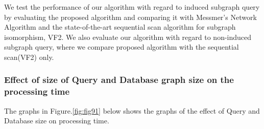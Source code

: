 We test the performance of our algorithm with regard to induced subgraph query by evaluating the proposed algorithm and comparing it with Messmer's Network Algorithm and the state-of-the-art sequential scan algorithm for subgraph isomorphism, VF2\cite{cordella2001_vf2}.
We also evaluate our algorithm with regard to non-induced subgraph query, where we compare proposed algorithm with the sequential scan(VF2) only.


\subsubsection{Effect of size of Query and Database graph size on  the processing time}
The graphs in Figure.\ref{fig:fig91} below shows the graphs of the effect of Query and Database size on processing time.  

